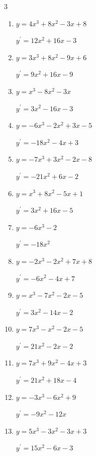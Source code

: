 \begin{multicols}{3}
\begin{enumerate}
  \item $y=4x^{3}+8x^{2}-3x+8$

        $\displaystyle y^{\prime}=12x^{2}+16x-3$

  \item $y=3x^{3}+8x^{2}-9x+6$

        $\displaystyle y^{\prime}=9x^{2}+16x-9$

  \item $y=x^{3}-8x^{2}-3x$

        $\displaystyle y^{\prime}=3x^{2}-16x-3$

  \item $y=-6x^{3}-2x^{2}+3x-5$

        $\displaystyle y^{\prime}=-18x^{2}-4x+3$

  \item $y=-7x^{3}+3x^{2}-2x-8$

        $\displaystyle y^{\prime}=-21x^{2}+6x-2$

  \item $y=x^{3}+8x^{2}-5x+1$

        $\displaystyle y^{\prime}=3x^{2}+16x-5$

  \item $y=-6x^{3}-2$

        $\displaystyle y^{\prime}=-18x^{2}$

  \item $y=-2x^{3}-2x^{2}+7x+8$

        $\displaystyle y^{\prime}=-6x^{2}-4x+7$

\columnbreak %

  \item $y=x^{3}-7x^{2}-2x-5$

        $\displaystyle y^{\prime}=3x^{2}-14x-2$

  \item $y=7x^{3}-x^{2}-2x-5$

        $\displaystyle y^{\prime}=21x^{2}-2x-2$

  \item $y=7x^{3}+9x^{2}-4x+3$

        $\displaystyle y^{\prime}=21x^{2}+18x-4$

  \item $y=-3x^{3}-6x^{2}+9$

        $\displaystyle y^{\prime}=-9x^{2}-12x$

  \item $y=5x^{3}-3x^{2}-3x+3$

        $\displaystyle y^{\prime}=15x^{2}-6x-3$


\end{enumerate}
\end{multicols}
